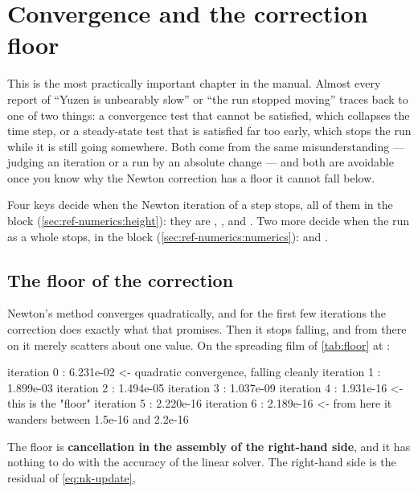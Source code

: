 \chapter{Convergence and the correction floor}
\label{ch:convergence}

This is the most practically important chapter in the manual. Almost every
report of ``Yuzen is unbearably slow'' or ``the run stopped moving'' traces back to
one of two things: a convergence test that cannot be satisfied, which collapses
the time step, or a steady-state test that is satisfied far too early, which
stops the run while it is still going somewhere. Both come from the same
misunderstanding --- judging an iteration or a run by an absolute change ---
and both are avoidable once you know why the Newton correction has a floor it
cannot fall below.

Four keys decide when the Newton iteration of a step stops, all of them in the
block  (\cref{sec:ref-numerics:height}): they are
, ,  and . Two
more decide when the run as a whole stops, in the block 
(\cref{sec:ref-numerics:numerics}):  and
.

\section{The floor of the correction}
\label{sec:convergence:floor}

Newton's method converges quadratically, and for the first few iterations the
correction does exactly what that promises. Then it stops falling, and from
there on it merely scatters about one value. On the spreading film of
\cref{tab:floor} at :

\begin{plain}
iteration 0 : 6.231e-02      <- quadratic convergence, falling cleanly
iteration 1 : 1.899e-03
iteration 2 : 1.494e-05
iteration 3 : 1.037e-09
iteration 4 : 1.931e-16      <- this is the "floor"
iteration 5 : 2.220e-16
iteration 6 : 2.189e-16      <- from here it wanders between 1.5e-16 and 2.2e-16
\end{plain}

The floor is \textbf{cancellation in the assembly of the right-hand side}, and
it has nothing to do with the accuracy of the linear solver. The right-hand
side is the residual of \cref{eq:nk-update},

